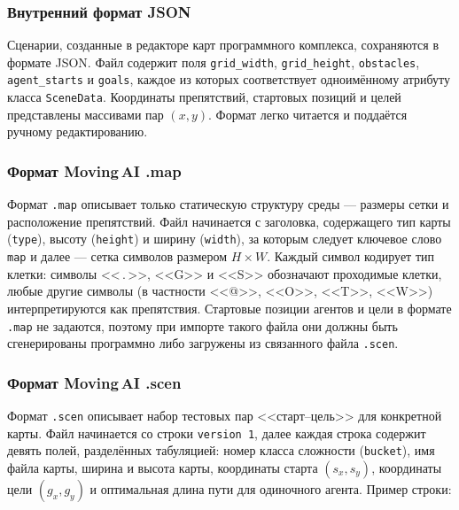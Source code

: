 \subsubsection{Внутренний формат JSON}

Сценарии, созданные в редакторе карт программного комплекса, сохраняются в формате JSON. Файл содержит поля \texttt{grid\_width}, \texttt{grid\_height}, \texttt{obstacles}, \texttt{agent\_starts} и \texttt{goals}, каждое из которых соответствует одноимённому атрибуту класса \texttt{SceneData}. Координаты препятствий, стартовых позиций и целей представлены массивами пар $(x, y)$. Формат легко читается и поддаётся ручному редактированию.

\subsubsection{Формат Moving\,AI .map}

Формат \texttt{.map} описывает только статическую структуру среды --- размеры сетки и расположение препятствий. Файл начинается с заголовка, содержащего тип карты (\texttt{type}), высоту (\texttt{height}) и ширину (\texttt{width}), за которым следует ключевое слово \texttt{map} и далее --- сетка символов размером $H \times W$. Каждый символ кодирует тип клетки: символы <<\,.\,>>, <<G>> и <<S>> обозначают проходимые клетки, любые другие символы (в частности <<@>>, <<O>>, <<T>>, <<W>>) интерпретируются как препятствия. Стартовые позиции агентов и цели в формате \texttt{.map} не задаются, поэтому при импорте такого файла они должны быть сгенерированы программно либо загружены из связанного файла \texttt{.scen}.

\subsubsection{Формат Moving\,AI .scen}

Формат \texttt{.scen} описывает набор тестовых пар <<старт--цель>> для конкретной карты. Файл начинается со строки \texttt{version 1}, далее каждая строка содержит девять полей, разделённых табуляцией: номер класса сложности (\texttt{bucket}), имя файла карты, ширина и высота карты, координаты старта $(s_x, s_y)$, координаты цели $(g_x, g_y)$ и оптимальная длина пути для одиночного агента. Пример строки:


